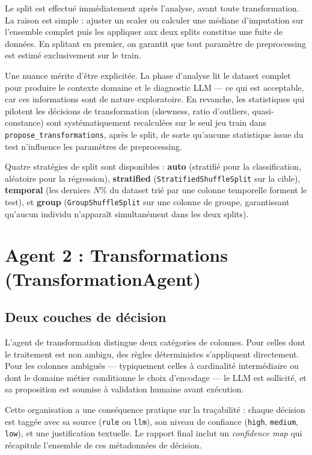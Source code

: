 \documentclass[12pt,a4paper]{article}
\begin{document}
Le split est effectué immédiatement après l'analyse, avant toute transformation.
La raison est simple : ajuster un scaler ou calculer une médiane d'imputation sur
l'ensemble complet puis les appliquer aux deux splits constitue une fuite de données.
En splitant en premier, on garantit que tout paramètre de preprocessing est estimé
exclusivement sur le train.

Une nuance mérite d'être explicitée. La phase d'analyse lit le dataset complet pour
produire le contexte domaine et le diagnostic LLM --- ce qui est acceptable, car ces
informations sont de nature exploratoire. En revanche, les statistiques qui pilotent
les décisions de transformation (skewness, ratio d'outliers, quasi-constance) sont
systématiquement recalculées sur le seul jeu train dans \texttt{propose\_transformations},
après le split, de sorte qu'aucune statistique issue du test n'influence les paramètres
de preprocessing.

Quatre stratégies de split sont disponibles : \textbf{auto} (stratifié pour la
classification, aléatoire pour la régression), \textbf{stratified}
(\texttt{StratifiedShuffleSplit} sur la cible), \textbf{temporal} (les derniers
$N\%$ du dataset trié par une colonne temporelle forment le test), et \textbf{group}
(\texttt{GroupShuffleSplit} sur une colonne de groupe, garantissant qu'aucun individu
n'apparaît simultanément dans les deux splits).

\section{Agent 2 : Transformations (TransformationAgent)}

\subsection{Deux couches de décision}

L'agent de transformation distingue deux catégories de colonnes. Pour celles dont le
traitement est non ambigu, des règles déterministes s'appliquent directement. Pour les
colonnes ambiguës --- typiquement celles à cardinalité intermédiaire ou dont le domaine
métier conditionne le choix d'encodage --- le LLM est sollicité, et sa proposition est
soumise à validation humaine avant exécution.

Cette organisation a une conséquence pratique sur la traçabilité : chaque décision est
taggée avec sa source (\texttt{rule} ou \texttt{llm}), son niveau de confiance
(\texttt{high}, \texttt{medium}, \texttt{low}), et une justification textuelle.
Le rapport final inclut un \textit{confidence map} qui récapitule l'ensemble de ces
métadonnées de décision.
\end{document}
